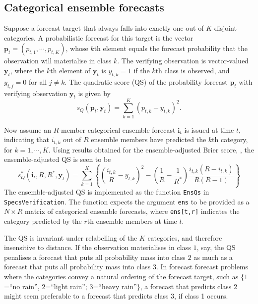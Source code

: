 \documentclass[10pt]{article}\usepackage[]{graphicx}\usepackage[]{color}
\newcommand{\pkg}[1]{\texttt{#1}}
\newcommand{\code}[1]{\texttt{#1}}
\begin{document}
\subsection{Categorical ensemble forecasts}

Suppose a forecast target that always falls into exactly one out of $K$ disjoint categories.
A probabilistic forecast for this target is the vector $\mathbf{p}_t = (p_{t,1}, \cdots, p_{t,K})$, whose $k$th element equals the forecast probability that the observation will materialise in class $k$.
The verifying observation is vector-valued $\mathbf{y}_t$, where the $k$th element of $\mathbf{y}_t$ is $y_{t,k}=1$ if the $k$th class is observed, and $y_{t,j}=0$ for all $j\neq k$. 
The quadratic score (QS) of the probability forecast $\mathbf{p}_t$ with verifying observation $\mathbf{y}_t$ is given by
%
\begin{equation}
s_{Q}(\mathbf{p}_t, \mathbf{y}_t) = \sum_{k=1}^K \left(p_{t,k} - y_{t,k}\right)^2.
\end{equation}


Now assume an $R$-member categorical ensemble forecast $\mathbf{i}_t$ is issued at time $t$, indicating that $i_{t,k}$ out of $R$ ensemble members have predicted the $k$th category, for $k=1,\cdots,K$.
Using results obtained for the ensemble-adjusted Brier score, \citep[see also][]{ferro2008effect}, the ensemble-adjusted QS is seen to be
%
\begin{equation}
s_{Q}^*(\mathbf{i}_t, R, R^*, \mathbf{y}_t) = \sum_{k=1}^K \left\{ \left(\frac{i_{t,k}}{R} - y_{t,k}\right)^2 - \left(\frac{1}{R} - \frac{1}{R^*}\right) \frac{i_{t,k}(R-i_{t,k})}{R(R-1)}\right\}
\end{equation}
%
The ensemble-adjusted QS is implemented as the function \code{EnsQs} in \pkg{SpecsVerification}.
The function expects the argument \code{ens} to be provided as a $N\times R$ matrix of categorical ensemble forecasts, where \code{ens[t,r]} indicates the category predicted by the $r$th ensemble members at time $t$. 

The QS is invariant under relabelling of the $K$ categories, and therefore insensitive to distance. 
If the observation materialises in class $1$, say, the QS penalises a forecast that puts all probability mass into class $2$ as much as a forecast that puts all probability mass into class $3$.
In forecast forecast problems where the categories convey a natural ordering of the forecast target, such as $\{1$=``no rain'', $2$=``light rain''; $3$=``heavy rain''$\}$, a forecast that predicts class 2 might seem preferable to a forecast that predicts class 3, if class 1 occurs. 
\end{document}
